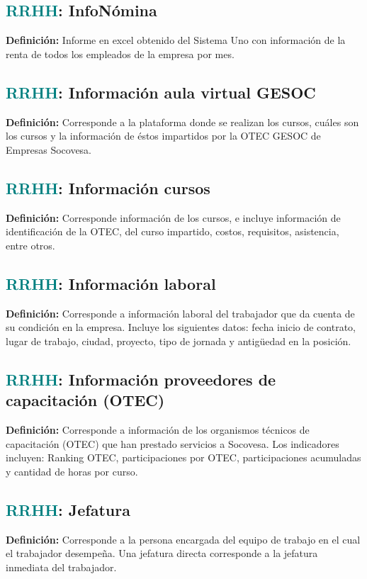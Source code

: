 \documentclass[12pt]{article}
\begin{document}
\subsection{\textcolor{teal}{RRHH}: InfoNómina}
\textbf{Definición:} Informe en excel obtenido del Sistema Uno con información de la renta de todos los empleados de la empresa por mes.
\subsection{\textcolor{teal}{RRHH}: Información aula virtual GESOC}
\textbf{Definición:} Corresponde a la plataforma donde se realizan los cursos, cuáles son los cursos y la información de éstos impartidos por la OTEC GESOC de Empresas Socovesa. 
\subsection{\textcolor{teal}{RRHH}: Información cursos }
\textbf{Definición:} Corresponde información de los cursos, e incluye información de identificación de la OTEC, del curso impartido, costos, requisitos, asistencia, entre otros.
\subsection{\textcolor{teal}{RRHH}: Información laboral}
\textbf{Definición:} Corresponde a información laboral del trabajador que da cuenta de su condición en la empresa. Incluye los siguientes datos: fecha inicio de contrato, lugar de trabajo, ciudad, proyecto, tipo de jornada y antigüedad en la posición.
\subsection{\textcolor{teal}{RRHH}: Información proveedores de capacitación (OTEC)}
\textbf{Definición:} Corresponde a información de los organismos técnicos de capacitación (OTEC) que han prestado servicios a Socovesa. Los indicadores incluyen: Ranking OTEC, participaciones por OTEC, participaciones acumuladas y cantidad de horas por curso.
\subsection{\textcolor{teal}{RRHH}: Jefatura}
\textbf{Definición:} Corresponde a la persona encargada del equipo de trabajo en el cual el trabajador desempeña. Una jefatura directa corresponde a la jefatura inmediata del trabajador.
\end{document}

